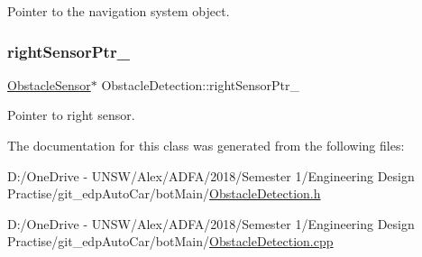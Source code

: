 Pointer to the navigation system object. 

\mbox{\label{class_obstacle_detection_a25b7aed86ead63e6f71154855cc2d42c}} 
\subsubsection{\texorpdfstring{right\+Sensor\+Ptr\+\_\+}{rightSensorPtr\_}}
{\footnotesize\ttfamily \mbox{\hyperlink{class_obstacle_sensor}{Obstacle\+Sensor}}$\ast$ Obstacle\+Detection\+::right\+Sensor\+Ptr\+\_\+\hspace{0.3cm}{\ttfamily [private]}}



Pointer to right sensor. 



The documentation for this class was generated from the following files\+:\begin{DoxyCompactItemize}
\item 
D\+:/\+One\+Drive -\/ U\+N\+S\+W/\+Alex/\+A\+D\+F\+A/2018/\+Semester 1/\+Engineering Design Practise/git\+\_\+edp\+Auto\+Car/bot\+Main/\mbox{\hyperlink{_obstacle_detection_8h}{Obstacle\+Detection.\+h}}\item 
D\+:/\+One\+Drive -\/ U\+N\+S\+W/\+Alex/\+A\+D\+F\+A/2018/\+Semester 1/\+Engineering Design Practise/git\+\_\+edp\+Auto\+Car/bot\+Main/\mbox{\hyperlink{_obstacle_detection_8cpp}{Obstacle\+Detection.\+cpp}}\end{DoxyCompactItemize}

